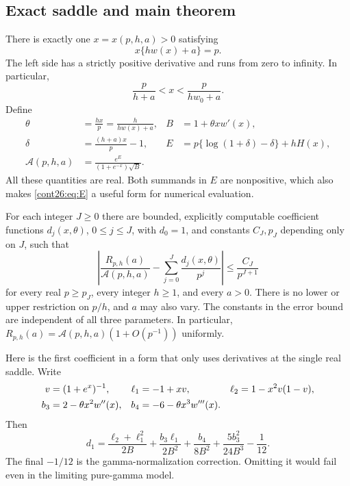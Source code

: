 \subsection{Exact saddle and main theorem}
There is exactly one $x=x(p,h,a)>0$ satisfying
\begin{equation}\label{cont26:eq:saddle}
 x\{h w(x)+a\}=p.
\end{equation}
The left side has a strictly positive derivative and runs from zero
to infinity. In particular,
\begin{equation}\label{cont26:eq:x-bracket}
 \frac{p}{h+a}<x<\frac{p}{h w_0+a}.
\end{equation}
Define
\begin{align}
 \theta&=\frac{hx}{p}=\frac{h}{h w(x)+a},&
 B&=1+\theta xw'(x),\label{cont26:eq:thetaB}\\
 \delta&=\frac{(h+a)x}{p}-1,&
 E&=p\{\log(1+\delta)-\delta\}+hH(x),\label{cont26:eq:E}\\
 \mathcal A(p,h,a)&=\frac{e^E}{(1+e^{-x})\sqrt B}.
 \label{cont26:eq:Auniform}
\end{align}
All these quantities are real. Both summands in $E$ are nonpositive,
which also makes \eqref{cont26:eq:E} a useful form for numerical evaluation.

\begin{theorem}\label{cont26:thm:uniform}
For each integer $J\geq0$ there are bounded, explicitly computable
coefficient functions $d_j(x,\theta)$, $0\leq j\leq J$, with $d_0=1$,
and constants $C_J,p_J$ depending only on $J$, such that
\begin{equation}\label{cont26:eq:uniform-all}
 \left|\frac{R_{p,h}(a)}{\mathcal A(p,h,a)}
       -\sum_{j=0}^J\frac{d_j(x,\theta)}{p^j}\right|
 \leq \frac{C_J}{p^{J+1}}
\end{equation}
for every real $p\geq p_J$, every integer $h\geq1$, and every $a>0$.
There is no lower or upper restriction on $p/h$, and $a$ may also vary.
The constants in the error bound are independent of all three parameters.
In particular, $R_{p,h}(a)=\mathcal A(p,h,a)(1+O(p^{-1}))$ uniformly.
\end{theorem}

Here is the first coefficient in a form that only uses derivatives at the
single real saddle. Write
\begin{align}
 v&=(1+e^x)^{-1},&
 \ell_1&=-1+xv,&\ell_2&=1-x^2v(1-v),\notag\\
 b_3&=2-\theta x^2w''(x),&
 b_4&=-6-\theta x^3w'''(x).\label{cont26:eq:first-data}
\end{align}
Then
\begin{equation}\label{cont26:eq:d1}
 d_1=\frac{\ell_2+\ell_1^2}{2B}
     +\frac{b_3\ell_1}{2B^2}
     +\frac{b_4}{8B^2}
     +\frac{5b_3^2}{24B^3}-\frac1{12}.
\end{equation}
The final $-1/12$ is the gamma-normalization correction. Omitting it
would fail even in the limiting pure-gamma model.

